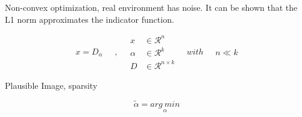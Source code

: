 Non-convex optimization, real environment has noise. It can be shown that the L1 norm approximates the indicator function.

\begin{equation}\label{intro:sparseland}
\begin{split}
x  =  D_{\alpha}
\end{split}
\quad , \quad
\begin{split}
x &\in \mathcal{R}^n\\
\alpha &\in \mathcal{R}^k\\
D &\in \mathcal{R}^{n \times k}
\end{split}
\quad with \quad
\begin{split}
n \ll k
\end{split}
\end{equation}

Plausible Image, sparsity

\begin{equation}\label{cs:noiseless}
\tilde{\alpha} =  \underset{\alpha}{arg\: min}
\end{equation}

